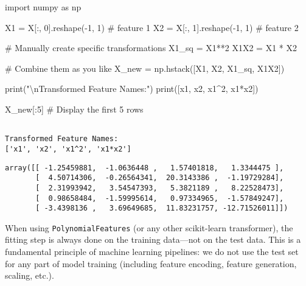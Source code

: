 \documentclass[
  letterpaper,
  DIV=11,
  numbers=noendperiod]{scrreprt}
\newenvironment{Shaded}{\begin{snugshade}}{\end{snugshade}}
\newcommand{\BuiltInTok}[1]{\textcolor[rgb]{0.00,0.23,0.31}{#1}}
\newcommand{\CharTok}[1]{\textcolor[rgb]{0.13,0.47,0.30}{#1}}
\newcommand{\CommentTok}[1]{\textcolor[rgb]{0.37,0.37,0.37}{#1}}
\newcommand{\DecValTok}[1]{\textcolor[rgb]{0.68,0.00,0.00}{#1}}
\newcommand{\ImportTok}[1]{\textcolor[rgb]{0.00,0.46,0.62}{#1}}
\newcommand{\NormalTok}[1]{\textcolor[rgb]{0.00,0.23,0.31}{#1}}
\newcommand{\OperatorTok}[1]{\textcolor[rgb]{0.37,0.37,0.37}{#1}}
\newcommand{\StringTok}[1]{\textcolor[rgb]{0.13,0.47,0.30}{#1}}
\begin{document}
\begin{Shaded}
\begin{Highlighting}[]
\ImportTok{import}\NormalTok{ numpy }\ImportTok{as}\NormalTok{ np}

\NormalTok{X1 }\OperatorTok{=}\NormalTok{ X[:, }\DecValTok{0}\NormalTok{].reshape(}\OperatorTok{{-}}\DecValTok{1}\NormalTok{, }\DecValTok{1}\NormalTok{)  }\CommentTok{\# feature 1}
\NormalTok{X2 }\OperatorTok{=}\NormalTok{ X[:, }\DecValTok{1}\NormalTok{].reshape(}\OperatorTok{{-}}\DecValTok{1}\NormalTok{, }\DecValTok{1}\NormalTok{)  }\CommentTok{\# feature 2}

\CommentTok{\# Manually create specific transformations}
\NormalTok{X1\_sq }\OperatorTok{=}\NormalTok{ X1}\OperatorTok{**}\DecValTok{2}
\NormalTok{X1X2 }\OperatorTok{=}\NormalTok{ X1 }\OperatorTok{*}\NormalTok{ X2}

\CommentTok{\# Combine them as you like}
\NormalTok{X\_new }\OperatorTok{=}\NormalTok{ np.hstack([X1, X2, X1\_sq, X1X2])}

\BuiltInTok{print}\NormalTok{(}\StringTok{"}\CharTok{\textbackslash{}n}\StringTok{Transformed Feature Names:"}\NormalTok{)}
\BuiltInTok{print}\NormalTok{([}\StringTok{\textquotesingle{}x1\textquotesingle{}}\NormalTok{, }\StringTok{\textquotesingle{}x2\textquotesingle{}}\NormalTok{, }\StringTok{\textquotesingle{}x1\^{}2\textquotesingle{}}\NormalTok{, }\StringTok{\textquotesingle{}x1*x2\textquotesingle{}}\NormalTok{])}

\NormalTok{X\_new[:}\DecValTok{5}\NormalTok{]  }\CommentTok{\# Display the first 5 rows}
\end{Highlighting}
\end{Shaded}

\begin{verbatim}

Transformed Feature Names:
['x1', 'x2', 'x1^2', 'x1*x2']
\end{verbatim}

\begin{verbatim}
array([[ -1.25459881,  -1.0636448 ,   1.57401818,   1.3344475 ],
       [  4.50714306,  -0.26564341,  20.3143386 ,  -1.19729284],
       [  2.31993942,   3.54547393,   5.3821189 ,   8.22528473],
       [  0.98658484,  -1.59995614,   0.97334965,  -1.57849247],
       [ -3.4398136 ,   3.69649685,  11.83231757, -12.71526011]])
\end{verbatim}

When using \texttt{PolynomialFeatures} (or any other scikit-learn
transformer), the fitting step is always done on the training data---not
on the test data. This is a fundamental principle of machine learning
pipelines: we do not use the test set for any part of model training
(including feature encoding, feature generation, scaling, etc.).
\end{document}
